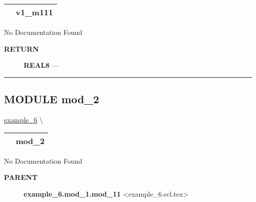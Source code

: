 {\renewcommand{\arraystretch}{1.5}
\begin{tabularx}{\textwidth}{|>{\raggedright\arraybackslash}l|X|}
\hline
\hspace{0pt}\mytexttt{\color{red} } & \textbf{v1\_m111} \\
\hline
\end{tabularx}
}

\par





No Documentation Found








\par
\begin{description}
\item [\colorbox{tagtype}{\color{white} \textbf{\textsf{RETURN}}}] \textbf{REAL8} --- 
\end{description}




\rule{\linewidth}{0.5pt}






\subsection*{\textsf{\colorbox{headtoc}{\color{white} MODULE}
mod\_2}}

\hypertarget{ecldoc:example_6.mod_2}{}
\hspace{0pt} \hyperlink{ecldoc:example_6}{example_6} \textbackslash 

{\renewcommand{\arraystretch}{1.5}
\begin{tabularx}{\textwidth}{|>{\raggedright\arraybackslash}l|X|}
\hline
\hspace{0pt}\mytexttt{\color{red} } & \textbf{mod\_2} \\
\hline
\end{tabularx}
}

\par





No Documentation Found










\par
\begin{description}
\item [\colorbox{tagtype}{\color{white} \textbf{\textsf{PARENT}}}] \textbf{example\_6.mod\_1.mod\_11} <example\_6.ecl.tex>
\end{description}


